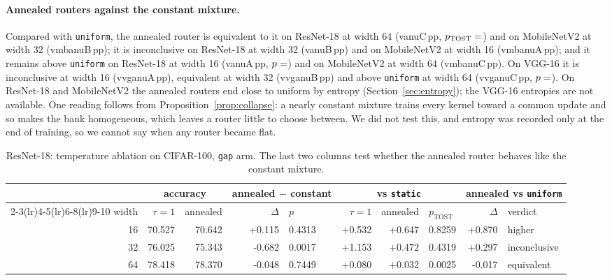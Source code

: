 \documentclass[10pt,a4paper]{article}
\newcommand{\V}[1]{\csname v#1\endcsname}
\begin{document}
\paragraph{Annealed routers against the constant mixture.} Compared with
\texttt{uniform}, the annealed router is equivalent to it on ResNet-18 at
width 64 (\V{anuC}\,pp, $p_{\text{TOST}}=\V{anuCT}$) and on MobileNetV2 at
width 32 (\V{mbanuB}\,pp); it is inconclusive on ResNet-18 at width 32
(\V{anuB}\,pp) and on MobileNetV2 at width 16 (\V{mbanuA}\,pp); and it
remains above \texttt{uniform} on ResNet-18 at width 16 (\V{anuA}\,pp,
$p=\V{anuAp}$) and on MobileNetV2 at width 64 (\V{mbanuC}\,pp). On VGG-16
it is inconclusive at width 16 (\V{vganuA}\,pp), equivalent at width 32
(\V{vganuB}\,pp) and above \texttt{uniform} at width 64 (\V{vganuC}\,pp,
$p=\V{vganuCp}$). On ResNet-18 and MobileNetV2 the annealed routers end
close to uniform by entropy (Section~\ref{sec:entropy}); the VGG-16
entropies are not available. One reading follows from
Proposition~\ref{prop:collapse}: a nearly constant mixture trains every
kernel toward a common update and so makes the bank homogeneous, which
leaves a router little to choose between. We did not test this, and
entropy was recorded only at the end of training, so we cannot say when
any router became flat.

\begin{table}[!htbp]\centering\small
\caption{ResNet-18: temperature ablation on CIFAR-100, \texttt{gap} arm. The last
two columns test whether the annealed router behaves like the constant
mixture.}
\label{tab:temp}
\begin{tabular}{r rr rl r rl rl}
\toprule
& \multicolumn{2}{c}{accuracy} & \multicolumn{2}{c}{annealed $-$ constant}
& \multicolumn{3}{c}{vs \texttt{static}} & \multicolumn{2}{c}{annealed vs \texttt{uniform}} \\
\cmidrule(lr){2-3}\cmidrule(lr){4-5}\cmidrule(lr){6-8}\cmidrule(lr){9-10}
width & $\tau=1$ & annealed & $\Delta$ & $p$ & $\tau=1$ & annealed & $p_{\text{TOST}}$ & $\Delta$ & verdict \\
\midrule
16 & 70.527 & 70.642 & +0.115 & 0.4313 & +0.532 & +0.647 & 0.8259 & +0.870 & higher \\
32 & 76.025 & 75.343 & -0.682 & 0.0017 & +1.153 & +0.472 & 0.4319 & +0.297 & inconclusive \\
64 & 78.418 & 78.370 & -0.048 & 0.7449 & +0.080 & +0.032 & 0.0025 & -0.017 & equivalent \\
\bottomrule
\end{tabular}
\end{table}
\end{document}
